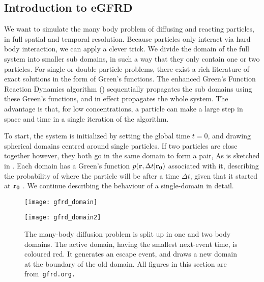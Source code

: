 \subsection{Introduction to eGFRD}
We want to simulate the many body problem of diffusing and reacting particles, in full spatial and temporal resolution. Because particles only interact via hard body interaction, we can apply a clever trick. We divide the domain of the full system into smaller sub domains, in such a way that they only contain one or two particles. For single or double particle problems, there exist a rich literature of exact solutions in the form of Green's functions. The enhanced Green's Function Reaction Dynamics algorithm (\GFRD) sequentially propagates the sub domains using these Green's functions, and in effect propagates the whole system. \cite{VanZon2006}\cite{VanZon2005}\cite{Takahashi2010} The advantage is that, for low concentrations, a particle can make a large step in space and time in a single iteration of the algorithm.

To start, the system is initialized by setting the global time $t=0$, and drawing spherical domains centred around single particles. If two particles are close together however, they both go in the same domain to form a pair, As is sketched in . Each domain has a Green's function $p({\bf r}, \Delta t|{\bf r_0})$ associated with it, describing the probability of where the particle will be after a time $\Delta t$, given that it started at ${\bf r_0}$ \cite{Carslaw1959}. We continue describing the behaviour of a single-domain in detail.

\begin{figure}[ht]
\begin{minipage}[ht]{.5\linewidth}
\centering
\texttt{[image: gfrd\_domain]}
\end{minipage}
\begin{minipage}[ht]{.5\linewidth}
\centering
\texttt{[image: gfrd\_domain2]}
\end{minipage}
\caption{ The many-body diffusion problem is split up in one and two body domains. The active domain, having the smallest next-event time, is coloured red. It generates an escape event, and draws a new domain at the boundary of the old domain. All figures in this section are from\tt{ gfrd.org}.}
\end{figure}

